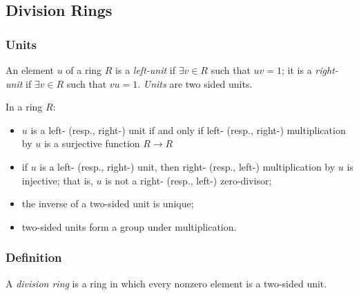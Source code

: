 \subsection{Division Rings}

\subsubsection{Units}\label{units}
An element $u$ of a ring $R$ is a \emph{left-unit} if $\exists v \in R$ such that $uv = 1$;
it is a \emph{right-unit} if $\exists v \in R$ such that $vu = 1$. \emph{Units} are two sided units.

\begin{proposition}
\label{unitproperties}
In a ring $R$:
\begin{itemize}
  \item $u$ is a left- (resp., right-) unit if and only if left- (resp., right-) multiplication by $u$
  is a surjective function $R \rightarrow R$
  \item if $u$ is a left- (resp., right-) unit, then right- (resp., left-) multiplication by $u$
  is injective; that is, $u$ is not a right- (resp., left-) zero-divisor;
  \item the inverse of a two-sided unit is unique;
  \item two-sided units form a group under multiplication.
\end{itemize}
\end{proposition}

\subsubsection{Definition}\label{divisionringdefinition}
A \emph{division ring} is a ring in which every nonzero element is a two-sided unit.